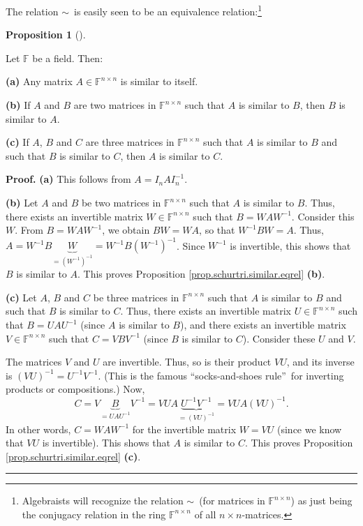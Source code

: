 \documentclass[numbers=enddot,12pt,final,onecolumn,notitlepage]{scrartcl}%
\numberwithin{exer}{subsection}
\theoremstyle{definition}
\newtheorem{prop}[theo]{Proposition}
\newenvironment{proposition}[1][]
{\begin{prop}[#1]\begin{leftbar}}
{\end{leftbar}\end{prop}}
\newenvironment{proof}[1][Proof]{\noindent\textbf{#1.} }{\ \rule{0.5em}{0.5em}}
\begin{document}
The relation $\sim$\ is easily seen to be an equivalence
relation:\footnote{Algebraists will recognize the relation $\sim$\ (for
matrices in $\mathbb{F}^{n\times n}$) as just being the conjugacy relation in
the ring $\mathbb{F}^{n\times n}$ of all $n\times n$-matrices.}

\begin{proposition}
\label{prop.schurtri.similar.eqrel}Let $\mathbb{F}$ be a field. Then: \medskip

\textbf{(a)} Any matrix $A\in\mathbb{F}^{n\times n}$ is similar to itself.
\medskip

\textbf{(b)} If $A$ and $B$ are two matrices in $\mathbb{F}^{n\times n}$ such
that $A$ is similar to $B$, then $B$ is similar to $A$. \medskip

\textbf{(c)} If $A$, $B$ and $C$ are three matrices in $\mathbb{F}^{n\times
n}$ such that $A$ is similar to $B$ and such that $B$ is similar to $C$, then
$A$ is similar to $C$.
\end{proposition}

\begin{proof}
\textbf{(a)} This follows from $A=I_{n}AI_{n}^{-1}$. \medskip

\textbf{(b)} Let $A$ and $B$ be two matrices in $\mathbb{F}^{n\times n}$ such
that $A$ is similar to $B$. Thus, there exists an invertible matrix
$W\in\mathbb{F}^{n\times n}$ such that $B=WAW^{-1}$. Consider this $W$. From
$B=WAW^{-1}$, we obtain $BW=WA$, so that $W^{-1}BW=A$. Thus, $A=W^{-1}%
B\underbrace{W}_{=\left(  W^{-1}\right)  ^{-1}}=W^{-1}B\left(  W^{-1}\right)
^{-1}$. Since $W^{-1}$ is invertible, this shows that $B$ is similar to $A$.
This proves Proposition \ref{prop.schurtri.similar.eqrel} \textbf{(b)}.
\medskip

\textbf{(c)} Let $A$, $B$ and $C$ be three matrices in $\mathbb{F}^{n\times
n}$ such that $A$ is similar to $B$ and such that $B$ is similar to $C$. Thus,
there exists an invertible matrix $U\in\mathbb{F}^{n\times n}$ such that
$B=UAU^{-1}$ (since $A$ is similar to $B$), and there exists an invertible
matrix $V\in\mathbb{F}^{n\times n}$ such that $C=VBV^{-1}$ (since $B$ is
similar to $C$). Consider these $U$ and $V$.

The matrices $V$ and $U$ are invertible. Thus, so is their product $VU$, and
its inverse is $\left(  VU\right)  ^{-1}=U^{-1}V^{-1}$. (This is the famous
\textquotedblleft socks-and-shoes rule\textquotedblright\ for inverting
products or compositions.) Now,%
\[
C=V\underbrace{B}_{=UAU^{-1}}V^{-1}=VUA\underbrace{U^{-1}V^{-1}}_{=\left(
VU\right)  ^{-1}}=VUA\left(  VU\right)  ^{-1}.
\]
In other words, $C=WAW^{-1}$ for the invertible matrix $W=VU$ (since we know
that $VU$ is invertible). This shows that $A$ is similar to $C$. This proves
Proposition \ref{prop.schurtri.similar.eqrel} \textbf{(c)}.
\end{proof}
\end{document}
